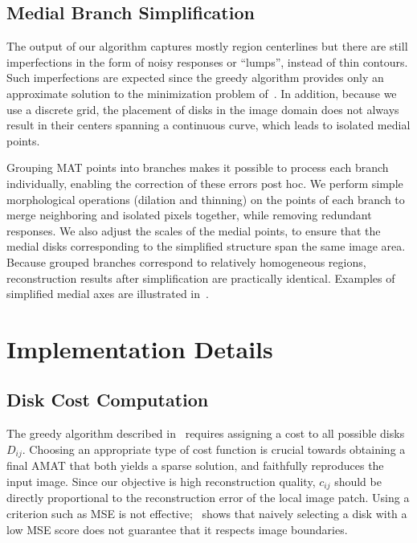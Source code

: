 \documentclass[10pt,twocolumn,letterpaper]{article}
\begin{document}
\subsection{Medial Branch Simplification}\label{sec:method:simplification}
The output of our algorithm captures mostly region centerlines but there are still
imperfections in the form of noisy responses or ``lumps'', instead of thin contours.
Such imperfections are expected since the greedy algorithm provides only an approximate solution
to the minimization problem of~. 
In addition, because we use a discrete grid, the placement of disks 
in the image domain does not always result in their centers spanning a continuous curve, 
which leads to isolated medial points.

Grouping MAT points into branches makes it possible to process each branch individually, enabling
the correction of these errors post hoc.
We perform simple morphological operations (dilation and thinning) 
on the points of each branch to merge neighboring and isolated pixels together, while removing 
redundant responses. 
We also adjust the scales of the medial points, to ensure that the medial disks corresponding 
to the simplified structure span the same image area.
Because grouped branches correspond to relatively homogeneous regions, reconstruction
results after simplification are practically identical.
Examples of simplified medial axes are illustrated in~.


\section{Implementation Details}\label{sec:implementation}
\subsection{Disk Cost Computation}\label{sec:implementation:diskcost}
The greedy algorithm described in~ requires assigning a cost to all possible disks $D_{ij}$.
Choosing an appropriate type of cost function is crucial towards obtaining a final AMAT that both 
yields a sparse solution, and faithfully reproduces the input image.
Since our objective is high reconstruction quality, $c_{ij}$ should be directly proportional
to the reconstruction error of the local image patch.
Using a criterion such as MSE is not effective;~ shows that naively selecting a disk with 
a low MSE score does not guarantee that it respects image boundaries.
\end{document}
